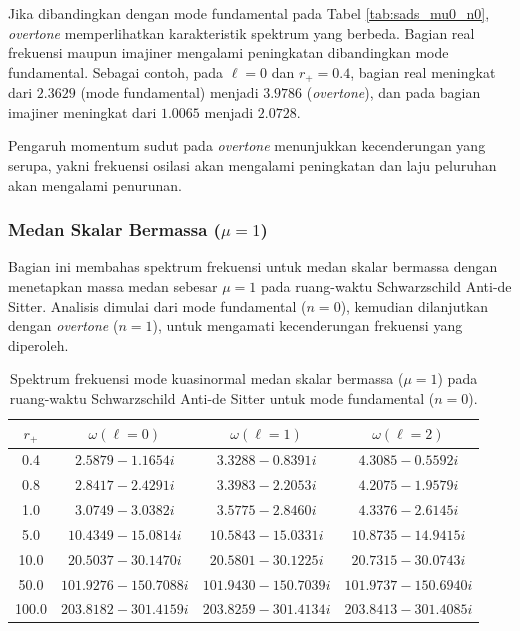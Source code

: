Jika dibandingkan dengan mode fundamental pada Tabel \ref{tab:sads_mu0_n0}, \textit{overtone} memperlihatkan karakteristik spektrum yang berbeda. Bagian real frekuensi maupun imajiner mengalami peningkatan dibandingkan mode fundamental. Sebagai contoh, pada $\ell=0$ dan $r_+=0.4$, bagian real meningkat dari $2.3629$ (mode fundamental) menjadi $3.9786$ (\textit{overtone}), dan pada bagian imajiner meningkat dari $1.0065$ menjadi $2.0728$.

Pengaruh momentum sudut pada \textit{overtone} menunjukkan kecenderungan yang serupa, yakni frekuensi osilasi akan mengalami peningkatan dan laju peluruhan akan mengalami penurunan.


\subsubsection*{Medan Skalar Bermassa ($\mu=1$)}

Bagian ini membahas spektrum frekuensi untuk medan skalar bermassa dengan menetapkan massa medan sebesar $\mu=1$ pada ruang-waktu Schwarzschild Anti-de Sitter. Analisis dimulai dari mode fundamental ($n=0$), kemudian dilanjutkan dengan \textit{overtone} ($n=1$), untuk mengamati kecenderungan frekuensi yang diperoleh.

\begin{table}[H]
\centering
\caption{Spektrum frekuensi mode kuasinormal medan skalar bermassa ($\mu=1$) pada ruang-waktu Schwarzschild Anti-de Sitter untuk mode fundamental ($n=0$).}
\vspace{0.2cm}
\renewcommand{\arraystretch}{1.25}
\begin{tabular}{cccc}
\toprule
$r_+$ & $\omega(\ell=0)$ & $\omega(\ell=1)$ & $\omega(\ell=2)$ \\
\midrule
0.4   & $2.5879 - 1.1654i$ & $3.3288 - 0.8391i$ & $4.3085 - 0.5592i$ \\
0.8   & $2.8417 - 2.4291i$ & $3.3983 - 2.2053i$ & $4.2075 - 1.9579i$ \\
1.0   & $3.0749 - 3.0382i$ & $3.5775 - 2.8460i$ & $4.3376 - 2.6145i$ \\
5.0   & $10.4349 - 15.0814i$ & $10.5843 - 15.0331i$ & $10.8735 - 14.9415i$ \\
10.0  & $20.5037 - 30.1470i$ & $20.5801 - 30.1225i$ & $20.7315 - 30.0743i$ \\
50.0  & $101.9276 - 150.7088i$ & $101.9430 - 150.7039i$ & $101.9737 - 150.6940i$ \\
100.0 & $203.8182 - 301.4159i$ & $203.8259 - 301.4134i$ & $203.8413 - 301.4085i$ \\
\bottomrule
\end{tabular}
\label{tab:sads_mu1_n0}
\end{table}

